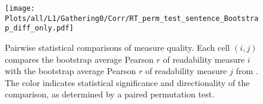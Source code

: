 \begin{figure}[ht!]
    \centering
    \texttt{[image: Plots/all/L1/Gathering0/Corr/RT\_perm\_test\_sentence\_Bootstrap\_diff\_only.pdf]}
    \caption{Pairwise statistical comparisons of measure quality. Each cell $(i,j)$ compares the bootstrap average Pearson $r$ of readability measure $i$ with the bootstrap average Pearson $r$ of readability measure $j$ from .  
    The color indicates statistical significance and directionality of the comparison, as determined by a paired permutation test.}
    \label{fig:RT_perm_test_sentence_Bootstrap_diff_only}
\end{figure}


